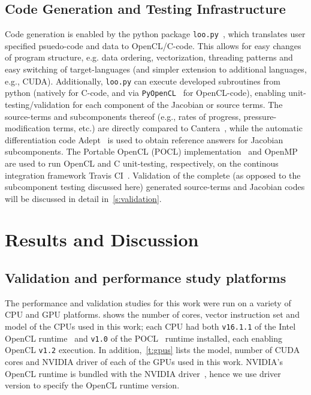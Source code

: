 \documentclass[12pt,number,sort&compress]{elsarticle}
\begin{document}
\subsection{Code Generation and Testing Infrastructure}
Code generation is enabled by the python package \texttt{loo.py}~\cite{kloeckner_loopy_2014}, which translates user specified psuedo-code and data to OpenCL\slash C-code.
This allows for easy changes of program structure, e.g. data ordering, vectorization, threading patterns and easy switching of target-languages (and simpler extension to additional languages, e.g., CUDA).
Additionally, \texttt{loo.py} can execute developed subroutines from python (natively for C-code, and via \texttt{PyOpenCL}~\cite{kloeckner_pycuda_2012} for OpenCL-code), enabling unit-testing\slash validation for each component of the Jacobian or source terms.
The source-terms and subcomponents thereof (e.g., rates of progress, pressure-modification terms, etc.) are directly compared to Cantera~\cite{Cantera}, while the automatic differentiation code Adept~\cite{adept-v11} is used to obtain reference answers for Jacobian subcomponents.
The Portable OpenCL (POCL) implementation~\cite{poclIJPP} and OpenMP~\cite{dagum1998openmp} are used to run OpenCL and C unit-testing, respectively, on the continous integration framework Travis CI~\cite{travis:2018}.
Validation of the complete (as opposed to the subcomponent testing discussed here) generated source-terms and Jacobian codes will be discussed in detail in~\cref{s:validation}.

\section{Results and Discussion}
\subsection{Validation and performance study platforms}

The performance and validation studies for this work were run on a variety of CPU and GPU platforms.
 shows the number of cores, vector instruction set and model of the CPUs used in this work; each CPU had both \texttt{v16.1.1} of the Intel OpenCL runtime~\cite{intelopencl:2018} and \texttt{v1.0} of the POCL~\cite{poclIJPP} runtime installed, each enabling OpenCL \texttt{v1.2} execution.
In addition,~\cref{t:gpus} lists the model, number of CUDA cores and NVIDIA driver of each of the GPUs used in this work.
NVIDIA's OpenCL runtime is bundled with the NVIDIA driver~\cite{NVIDIA:2018}, hence we use driver version to specify the OpenCL runtime version.
\end{document}

